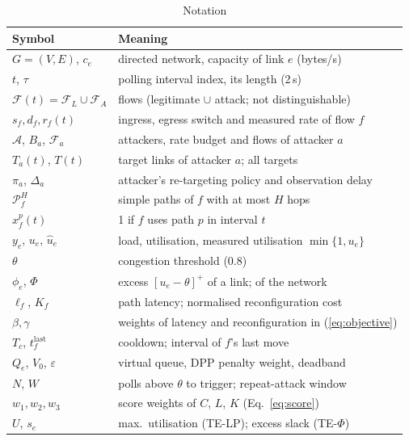 \begin{table}[t]\centering\footnotesize
\caption{Notation}\label{tab:notation}
\begin{tabular}{@{}ll@{}}
\toprule
Symbol & Meaning \\
\midrule
$G=(V,E)$, $c_e$ & directed network, capacity of link $e$ (bytes/s) \\
$t$, $\tau$ & polling interval index, its length (2\,s) \\
$\mathcal{F}(t)=\mathcal{F}_L\cup\mathcal{F}_A$ & flows (legitimate $\cup$ attack; not distinguishable) \\
$s_f,d_f,r_f(t)$ & ingress, egress switch and measured rate of flow $f$ \\
$\mathcal{A}$, $B_a$, $\mathcal{F}_a$ & attackers, rate budget and flows of attacker $a$ \\
$T_a(t)$, $T(t)$ & target links of attacker $a$; all targets \\
$\pi_a$, $\Delta_a$ & attacker's re-targeting policy and observation delay \\
$\mathcal{P}_f^H$ & simple paths of $f$ with at most $H$ hops \\
$x_f^p(t)$ & 1 if $f$ uses path $p$ in interval $t$ \\
$y_e$, $u_e$, $\hat u_e$ & load, utilisation, measured utilisation $\min\{1,u_e\}$ \\
$\theta$ & congestion threshold (0.8) \\
$\phi_e$, $\Phi$ & excess $[u_e-\theta]^+$ of a link; of the network \\
$\ell_f$, $K_f$ & path latency; normalised reconfiguration cost \\
$\beta,\gamma$ & weights of latency and reconfiguration in (\ref{eq:objective}) \\
$T_c$, $t_f^{\mathrm{last}}$ & cooldown; interval of $f$'s last move \\
$Q_e$, $V_0$, $\varepsilon$ & virtual queue, DPP penalty weight, deadband \\
$N$, $W$ & polls above $\theta$ to trigger; repeat-attack window \\
$w_1,w_2,w_3$ & score weights of $C$, $L$, $K$ (Eq.~\ref{eq:score}) \\
$U$, $s_e$ & max.\ utilisation (TE-LP); excess slack (TE-$\Phi$) \\
\bottomrule
\end{tabular}
\end{table}
